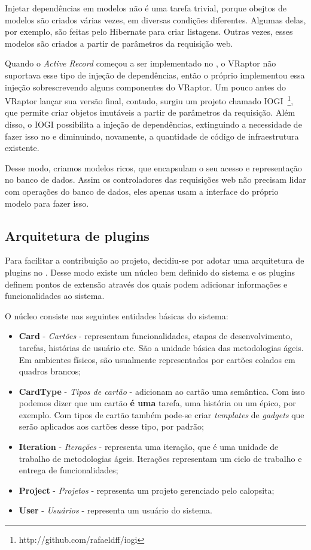 Injetar dependências em modelos não é uma tarefa trivial, porque obejtos de modelos são criados várias vezes, em diversas condições diferentes. Algumas delas, por exemplo, são feitas pelo Hibernate para criar listagens. Outras vezes, esses modelos são criados a partir de parâmetros da requisição web. 

Quando o \textit{Active Record} começou a ser implementado no \calopsita{}, o VRaptor não suportava esse tipo de injeção de dependências, então o próprio \calopsita{} implementou essa injeção sobrescrevendo alguns componentes do VRaptor. Um pouco antes do VRaptor lançar sua versão final, contudo, surgiu um projeto \opensource{} chamado IOGI~\footnote{http://github.com/rafaeldff/iogi}, que permite criar objetos imutáveis a partir de parâmetros da requisição. Além disso, o IOGI possibilita a injeção de dependências, extinguindo a necessidade de fazer isso no \calopsita{} e diminuindo, novamente, a quantidade de código de infraestrutura existente.

Desse modo, criamos modelos ricos, que encapsulam o seu acesso e representação no banco de dados. Assim os controladores das requisições web não precisam lidar com operações do banco de dados, eles apenas usam a interface do próprio modelo para fazer isso.

\subsection{Arquitetura de plugins}

Para facilitar a contribuição ao projeto, decidiu-se por adotar uma arquitetura de plugins no \calopsita{}. Desse modo existe um núcleo bem definido do sistema e os plugins definem pontos de extensão através dos quais podem adicionar informações e funcionalidades ao sistema.

O núcleo consiste nas seguintes entidades básicas do sistema:

\begin{itemize}
	\item{\textbf{Card} - \textit{Cartões} - representam funcionalidades, etapas de desenvolvimento, tarefas, histórias de usuário etc. São a unidade básica das metodologias ágeis. Em ambientes físicos, são usualmente representados por cartões colados em quadros brancos;}
	\item{\textbf{CardType} - \textit{Tipos de cartão} - adicionam ao cartão uma semântica. Com isso podemos dizer que um cartão \textbf{é uma} tarefa, uma história ou um épico, por exemplo. Com tipos de cartão também pode-se criar \textit{templates} de \textit{gadgets} que serão aplicados aos cartões desse tipo, por padrão;}
	\item{\textbf{Iteration} - \textit{Iterações} - representa uma iteração, que é uma unidade de trabalho de metodologias ágeis. Iterações representam um ciclo de trabalho e entrega de funcionalidades;}
	\item{\textbf{Project} - \textit{Projetos} - representa um projeto gerenciado pelo calopsita;}
	\item{\textbf{User} - \textit{Usuários} - representa um usuário do sistema.}
\end{itemize}

